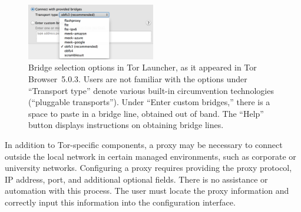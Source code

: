 \documentclass[USenglish,oneside,twocolumn]{article}
\begin{document}
\begin{figure}
  \centering
    \includegraphics[width=0.5\textwidth]{bridge-options.png}
\caption{
Bridge selection options in Tor Launcher, as it appeared in Tor Browser~5.0.3.
Users are not familiar with the options under ``Transport type'' denote various
built-in circumvention technologies (``pluggable transports'').
Under ``Enter custom bridges,'' there is a space to paste in
a bridge line, obtained out of band.
The ``Help'' button displays instructions on obtaining
bridge lines. 
}
\label{fig:bridge-options}
\end{figure}

In addition to Tor-specific components, a proxy may be necessary to connect 
outside the local network in certain managed environments, such as corporate or university networks.
Configuring a proxy requires providing the proxy protocol, IP address, port, and additional optional
fields. There is no assistance or automation with this process. The user must locate the 
proxy information and correctly input this information into the configuration interface. 
  
\end{document}
